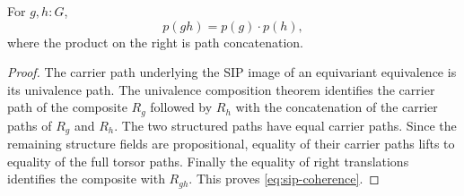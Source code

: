 \begin{proposition}
For $g,h:G$,
\begin{equation}
p(gh)=p(g)\mathbin{\cdot}p(h),
\label{eq:sip-coherence}
\end{equation}
where the product on the right is path concatenation.
\end{proposition}
\begin{proof}
The carrier path underlying the SIP image of an equivariant equivalence is its univalence path. The univalence composition theorem identifies the carrier path of the composite $R_g$ followed by $R_h$ with the concatenation of the carrier paths of $R_g$ and $R_h$. The two structured paths have equal carrier paths. Since the remaining structure fields are propositional, equality of their carrier paths lifts to equality of the full torsor paths. Finally the equality of right translations identifies the composite with $R_{gh}$. This proves \eqref{eq:sip-coherence}.
\end{proof}

